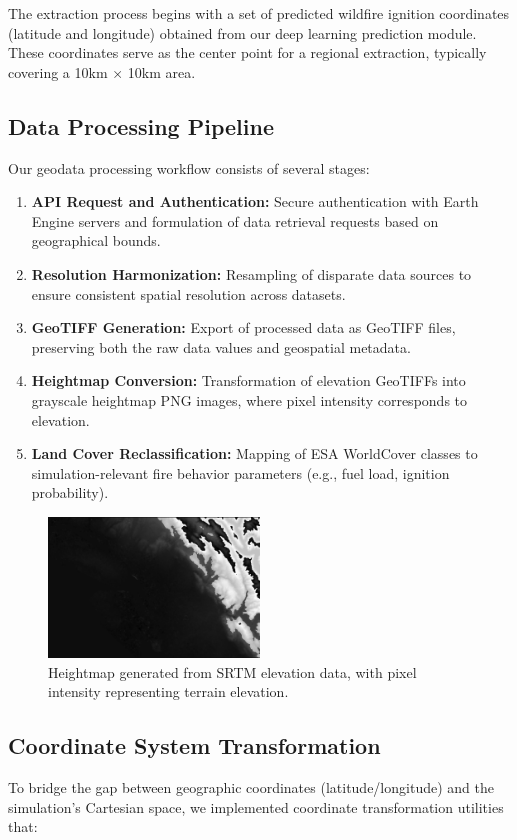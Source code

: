 \documentclass[conference]{IEEEtran}
\begin{document}
\noindent
The extraction process begins with a set of predicted wildfire ignition coordinates (latitude and longitude) obtained from our deep learning prediction module. These coordinates serve as the center point for a regional extraction, typically covering a 10km × 10km area.

\subsection{Data Processing Pipeline}
Our geodata processing workflow consists of several stages:

\begin{enumerate}
    \item \textbf{API Request and Authentication:} Secure authentication with Earth Engine servers and formulation of data retrieval requests based on geographical bounds.
    \item \textbf{Resolution Harmonization:} Resampling of disparate data sources to ensure consistent spatial resolution across datasets.
    \item \textbf{GeoTIFF Generation:} Export of processed data as GeoTIFF files, preserving both the raw data values and geospatial metadata.
    \item \textbf{Heightmap Conversion:} Transformation of elevation GeoTIFFs into grayscale heightmap PNG images, where pixel intensity corresponds to elevation.
    \item \textbf{Land Cover Reclassification:} Mapping of ESA WorldCover classes to simulation-relevant fire behavior parameters (e.g., fuel load, ignition probability).
\end{enumerate}

\begin{figure}[h!]
\centering
\includegraphics[width=0.5\textwidth]{heightmap.png}
\caption{Heightmap generated from SRTM elevation data, with pixel intensity representing terrain elevation.}
\end{figure}

\subsection{Coordinate System Transformation}
To bridge the gap between geographic coordinates (latitude/longitude) and the simulation's Cartesian space, we implemented coordinate transformation utilities that:
\end{document}
